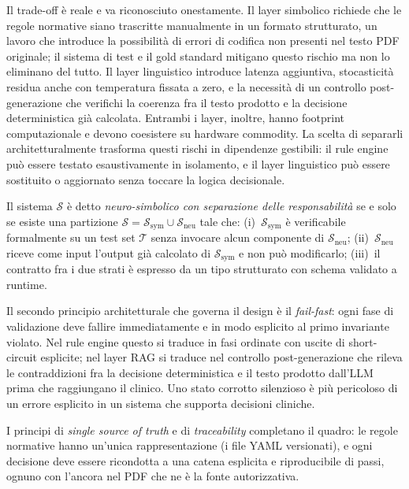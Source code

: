 Il trade-off è reale e va riconosciuto onestamente.
Il layer simbolico richiede che le regole normative siano trascritte
manualmente in un formato strutturato, un lavoro che introduce la possibilità
di errori di codifica non presenti nel testo PDF originale;
il sistema di test e il gold standard mitigano questo rischio
ma non lo eliminano del tutto.
Il layer linguistico introduce latenza aggiuntiva, stocasticità residua
anche con temperatura fissata a zero, e la necessità di un controllo
post-generazione che verifichi la coerenza fra il testo prodotto e la
decisione deterministica già calcolata.
Entrambi i layer, inoltre, hanno footprint computazionale e devono
coesistere su hardware commodity.
La scelta di separarli architetturalmente trasforma questi rischi in
dipendenze gestibili: il rule engine può essere testato esaustivamente
in isolamento, e il layer linguistico può essere sostituito o aggiornato
senza toccare la logica decisionale.

\begin{definition}
\label{def:separazione}
Il sistema $\mathcal{S}$ è detto \emph{neuro-simbolico con separazione
delle responsabilità} se e solo se esiste una partizione
$\mathcal{S} = \mathcal{S}_{\text{sym}} \cup \mathcal{S}_{\text{neu}}$
tale che: (i)~$\mathcal{S}_{\text{sym}}$ è verificabile formalmente
su un test set $\mathcal{T}$ senza invocare alcun componente di
$\mathcal{S}_{\text{neu}}$; (ii)~$\mathcal{S}_{\text{neu}}$ riceve
come input l'output già calcolato di $\mathcal{S}_{\text{sym}}$
e non può modificarlo; (iii)~il contratto fra i due strati è espresso
da un tipo strutturato con schema validato a runtime.
\end{definition}

Il secondo principio architetturale che governa il design è il
\emph{fail-fast}: ogni fase di validazione deve fallire immediatamente
e in modo esplicito al primo invariante violato.
Nel rule engine questo si traduce in fasi ordinate con uscite di
short-circuit esplicite; nel layer RAG si traduce nel controllo
post-generazione che rileva le contraddizioni fra la decisione
deterministica e il testo prodotto dall'LLM prima che raggiungano
il clinico.
Uno stato corrotto silenzioso è più pericoloso di un errore esplicito
in un sistema che supporta decisioni cliniche.

I principi di \emph{single source of truth} e di \emph{traceability}
completano il quadro: le regole normative hanno un'unica rappresentazione
(i file YAML versionati), e ogni decisione deve essere ricondotta a una
catena esplicita e riproducibile di passi, ognuno con l'ancora nel PDF
che ne è la fonte autorizzativa.

